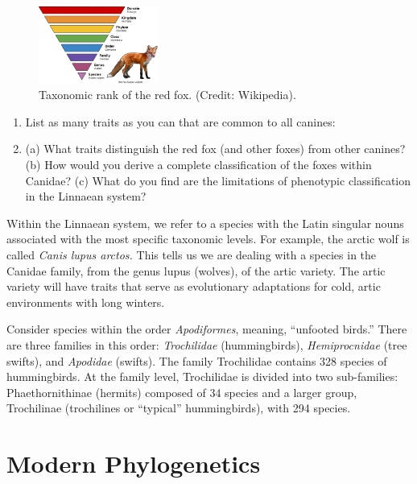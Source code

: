 \documentclass[12pt]{article}
\begin{document}
\begin{figure}[hb]
\centering
\includegraphics[width=0.35\textwidth]{figures/fox.png}
\caption{\label{fig:1} Taxonomic rank of the red fox.  (Credit: Wikipedia).}
\end{figure}

\vspace{1cm}

\begin{enumerate}
\item List as many traits as you can that are common to all canines: \\ \vspace{2cm}
\item (a) What traits distinguish the red fox (and other foxes) from other canines?  (b) How would you derive a complete classification of the foxes within Canidae? (c) What do you find are the limitations of phenotypic classification in the Linnaean system? \\ \vspace{2cm}
\end{enumerate}

Within the Linnaean system, we refer to a species with the Latin singular nouns associated with the most specific taxonomic levels.  For example, the arctic wolf is called \textit{Canis lupus arctos.}  This tells us we are dealing with a species in the Canidae family, from the genus lupus (wolves), of the artic variety.  The artic variety will have traits that serve as evolutionary adaptations for cold, artic environments with long winters.

Consider species within the order \textit{Apodiformes}, meaning, ``unfooted birds.''  There are three families in this order: \textit{Trochilidae} (hummingbirds), \textit{Hemiprocnidae} (tree swifts), and \textit{Apodidae} (swifts). The family Trochilidae contains 328 species of hummingbirds. At the family level, Trochilidae is divided into two sub-families: Phaethornithinae (hermits) composed of 34 species and a larger group, Trochilinae (trochilines or ``typical'' hummingbirds), with 294 species.

\section{Modern Phylogenetics}
\end{document}
